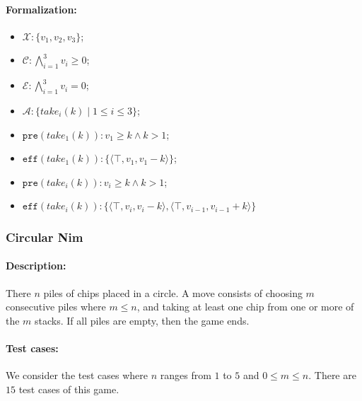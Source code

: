 \documentclass[review]{elsarticle}
\newcommand{\set}[1]{\{ #1 \}}
\newcommand{\tuple}[1]{\langle {#1} \rangle}
\newcommand{\true}{\top}
\newcommand{\statevar}{\mathcal{X}}
\newcommand{\act}{\mathcal{A}}
\newcommand{\constraint}{\mathcal{C}}
\newcommand{\estate}{\mathcal{E}}
\newcommand{\pre}{\mathtt{pre}}
\newcommand{\eff}{\mathtt{eff}}
\begin{document}
\paragraph{Formalization:}
\begin{itemize}
	\item $\statevar: \set{v_1, v_2, v_3}$;
	\item $\constraint:\bigwedge_{i=1}^{3} v_i \ge 0$;
	\item $\estate: \bigwedge_{i=1}^{3} v_i = 0$;
	\item $\act:\set{take_i(k){\mid}1 \le i \le 3} $;
	\item $\pre(take_1(k)) : v_1 \ge k \wedge k > 1$;
	\item $\eff(take_1(k)) : \set{\tuple{\true,v_1,v_1 -k}}$;
	\item $\pre(take_i(k)) : v_i \ge k \wedge k > 1$;
	\item $\eff(take_i(k)) : \set{\tuple{\true,v_i,v_i -k}, \tuple{\true,v_{i-1},v_{i-1} + k}}$
\end{itemize}

\subsubsection{Circular Nim \protect\cite{DufH2013}}

\paragraph{Description:}  
There $n$ piles of chips placed in a circle. 
A move consists of choosing $m$ consecutive piles where $m \leq n$, and taking at least one chip from one or more of the $m$ stacks. 
If all piles are empty, then the game ends. 
%		

\paragraph{Test cases:}
We consider the test cases where $n$ ranges from $1$ to $5$ and $0 \le m \leq n$.
There are $15$ test cases of this game.
\end{document}
